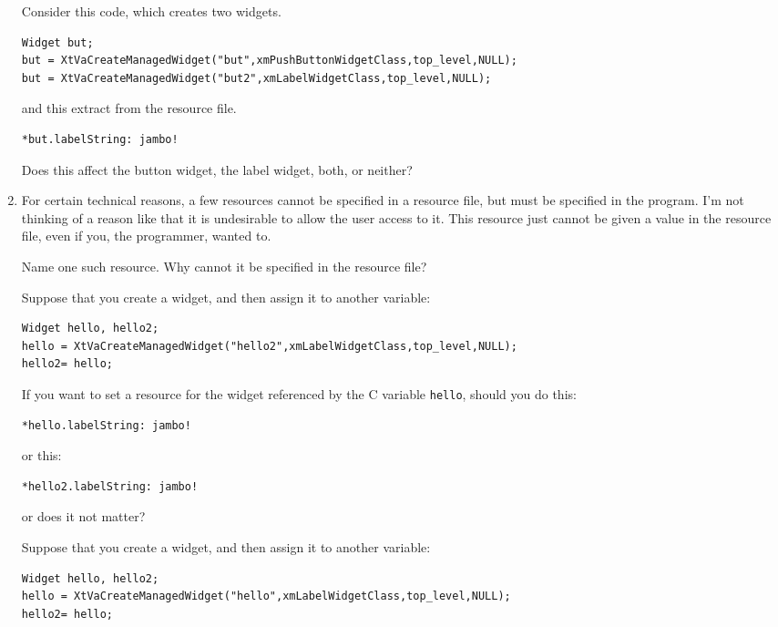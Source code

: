 \documentclass[twoside]{article}
\begin{document}
\begin{enumerate}
 Consider this code, which creates two widgets.

\begin{verbatim}
Widget but;
but = XtVaCreateManagedWidget("but",xmPushButtonWidgetClass,top_level,NULL);
but = XtVaCreateManagedWidget("but2",xmLabelWidgetClass,top_level,NULL);
\end{verbatim}

\noindent and this extract from the resource file.

\begin{verbatim}
*but.labelString: jambo!
\end{verbatim}

Does this affect the button widget, the label widget, both, or neither?


\item
For certain technical reasons, a few resources cannot be specified
in a resource file, but must be specified in the program.  I'm not
thinking of a reason like that it is undesirable to allow the
user access to it.  This resource just cannot be given a value in
the resource file, even if you, the programmer, wanted to.
\begin{enumerate}
\setlength{\itemsep}{0in}
 Name one such resource.
 Why cannot it be specified in the resource file?
\end{enumerate}


 Suppose that you create a widget, and then assign it to
another variable:

\begin{verbatim}
Widget hello, hello2;
hello = XtVaCreateManagedWidget("hello2",xmLabelWidgetClass,top_level,NULL);
hello2= hello;
\end{verbatim}

If you want to set a resource for the widget referenced by the C variable \texttt{hello}, should you do this:
\begin{verbatim}
*hello.labelString: jambo!
\end{verbatim}
or this:
\begin{verbatim}
*hello2.labelString: jambo!
\end{verbatim}
or does it not matter?


 Suppose that you create a widget, and then assign it to
another variable:

\begin{verbatim}
Widget hello, hello2;
hello = XtVaCreateManagedWidget("hello",xmLabelWidgetClass,top_level,NULL);
hello2= hello;
\end{verbatim}


\end{enumerate}
\end{document}
